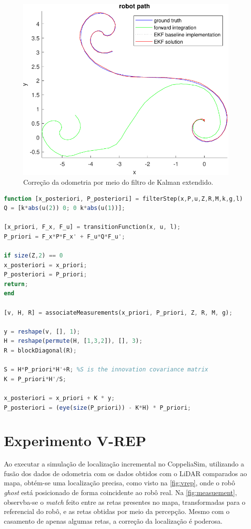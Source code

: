 \begin{figure}[H]
	\centering
	\includegraphics[width=0.75\linewidth]{img/odometry_filtered}
	\caption{Correção da odometria por meio do filtro de Kalman extendido.}
	\label{fig:odometry_filtered}
\end{figure}

\begin{lstlisting}[language=Octave]
function [x_posteriori, P_posteriori] = filterStep(x,P,u,Z,R,M,k,g,l)
Q = [k*abs(u(2)) 0; 0 k*abs(u(1))]; 

[x_priori, F_x, F_u] = transitionFunction(x, u, l); 
P_priori = F_x*P*F_x' + F_u*Q*F_u';

if size(Z,2) == 0
x_posteriori = x_priori;
P_posteriori = P_priori;
return;
end

[v, H, R] = associateMeasurements(x_priori, P_priori, Z, R, M, g);

y = reshape(v, [], 1);
H = reshape(permute(H, [1,3,2]), [], 3);
R = blockDiagonal(R);

S = H*P_priori*H'+R; %S is the innovation covariance matrix
K = P_priori*H'/S;

x_posteriori = x_priori + K * y;
P_posteriori = (eye(size(P_priori)) - K*H) * P_priori;
\end{lstlisting}

\clearpage

\section{Experimento V-REP}

Ao executar a simulação de localização incremental no CoppeliaSim, utilizando a fusão dos dados de odometria com os dados obtidos com o LiDAR comparados ao mapa, obtém-se uma localização precisa, como visto na \autoref{fig:vrep}, onde o robô \textit{ghost} está posicionado de forma coincidente ao robô real. Na \autoref{fig:measuement}, observba-se o \textit{match} feito entre as retas presentes no mapa, transformadas para o referencial do robô, e as retas obtidas por meio da percepção. Mesmo com o casamento de apenas algumas retas, a correção da localização é poderosa.

